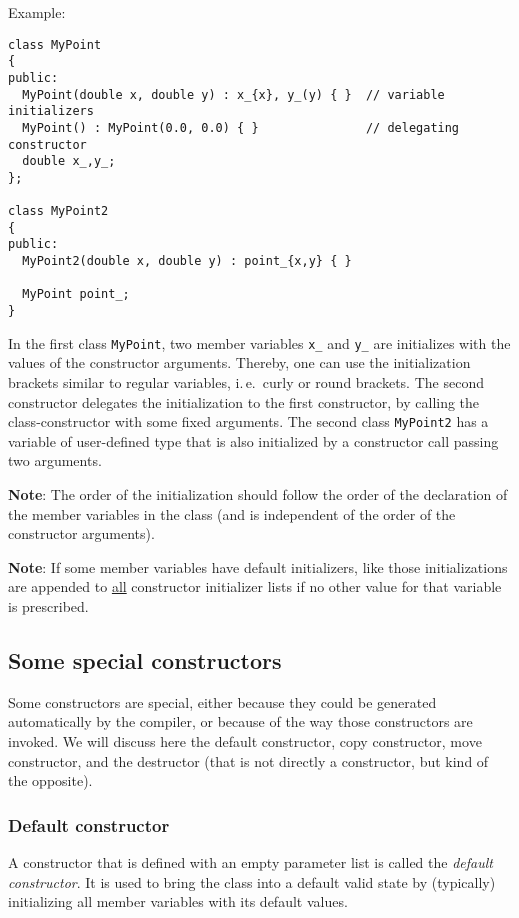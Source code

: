 Example:
\begin{verbatim}
class MyPoint
{
public:
  MyPoint(double x, double y) : x_{x}, y_(y) { }  // variable initializers
  MyPoint() : MyPoint(0.0, 0.0) { }               // delegating constructor
  double x_,y_;
};

class MyPoint2
{
public:
  MyPoint2(double x, double y) : point_{x,y} { }

  MyPoint point_;
}
\end{verbatim}
%
In the first class \texttt{MyPoint}, two member variables \texttt{x\_} and \texttt{y\_} are initializes with the values of the constructor arguments. Thereby,
one can use the initialization brackets similar to regular variables, i.\,e.\ curly or round brackets. The second constructor delegates the initialization to
the first constructor, by calling the class-constructor with some fixed arguments. The second class \texttt{MyPoint2} has a variable of user-defined type
that is also initialized by a constructor call passing two arguments.

\textbf{Note}: The order of the initialization should follow the order of the declaration of the member variables in the class (and is independent of the order
of the constructor arguments).

\textbf{Note}: If some member variables have default initializers, like  those initializations are appended to \underline{all} constructor
initializer lists if no other value for that variable is prescribed.


\subsection{Some special constructors}
Some constructors are special, either because they could be generated automatically by the compiler, or because of the way those constructors are invoked. We
will discuss here the default constructor, copy constructor, move constructor, and the destructor (that is not directly a constructor, but kind of the opposite).


\subsubsection{Default constructor}
A constructor that is defined with an empty parameter list is called the \emph{default constructor}. It is used to bring the class into a default valid state
by (typically) initializing all member variables with its default values.


